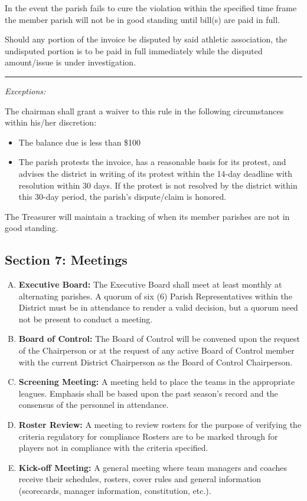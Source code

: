 In the event the parish fails to cure the violation within the specified time frame the member parish will not be in good standing until bill(s) are paid in full.

Should any portion of the invoice be disputed by said athletic association, the undisputed portion is to be paid in full immediately while the disputed amount/issue is under investigation. 
\plainbreak{1}
{\em Exceptions:}

The chairman shall grant a waiver to this rule in the following circumstances within his/her discretion:
\begin{itemize}[\textbullet]
    \item The balance due is less than \$100
    \item The parish protests the invoice, has a reasonable basis for its protest, and advises the district in writing of its protest within the 14-day deadline with resolution within 30 days. If the protest is not resolved by the district within this 30-day period, the parish's dispute/claim is honored.
\end{itemize}

The Treasurer will maintain a tracking of when its member parishes are not in good standing.  

\subsection{Section 7: Meetings}
\label{ssec:const-4-7}
\begin{enumerate}[A.]
    \item \textbf{Executive Board:}  The Executive Board shall meet at least monthly at alternating parishes.  A quorum of six (6)
    Parish Representatives within the District must be in attendance to render a valid decision, but a quorum need 
    not be present to conduct a meeting.
    \item \textbf{Board of Control:}  The Board of Control will be convened upon the request of the Chairperson or at the request 
    of any active Board of Control member with the current District Chairperson as the Board of Control Chairperson.
    \item \textbf{Screening Meeting:}  A meeting held to place the teams in the appropriate leagues.  Emphasis shall be based upon 
    the past season’s record and the consensus of the personnel in attendance.
    \item \textbf{Roster Review:}  A meeting to review rosters for the purpose of verifying the criteria regulatory for compliance
	Rosters are to be marked through for players not in compliance with the criteria specified.
    \item \textbf{Kick-off Meeting:}  A general meeting where team managers and coaches receive their schedules, rosters, cover
    rules and general information (scorecards, manager information, constitution, etc.).
\end{enumerate}

